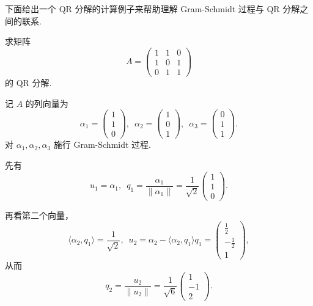 下面给出一个 QR 分解的计算例子来帮助理解 Gram-Schmidt 过程与 QR 分解之间的联系.

\begin{example}{}{}
    求矩阵
    \[
        A = \begin{pmatrix}
            1 & 1 & 0 \\
            1 & 0 & 1 \\
            0 & 1 & 1
        \end{pmatrix}
    \]
    的 QR 分解.
\end{example}

\begin{solution}
    记 $A$ 的列向量为
    \[
        \alpha_1 = \begin{pmatrix}
            1 \\
            1 \\
            0
        \end{pmatrix}, \enspace
        \alpha_2 = \begin{pmatrix}
            1 \\
            0 \\
            1
        \end{pmatrix}, \enspace
        \alpha_3 = \begin{pmatrix}
            0 \\
            1 \\
            1
        \end{pmatrix}.
    \]
    对 $\alpha_1, \alpha_2, \alpha_3$ 施行 Gram-Schmidt 过程.

    先有
    \[
        u_1 = \alpha_1, \enspace q_1 = \frac{\alpha_1}{\lVert \alpha_1 \rVert}
        = \frac{1}{\sqrt{2}}
        \begin{pmatrix}
            1 \\
            1 \\
            0
        \end{pmatrix}.
    \]

    再看第二个向量，
    \[
        \langle \alpha_2, q_1 \rangle = \frac{1}{\sqrt{2}}, \enspace
        u_2 = \alpha_2 - \langle \alpha_2, q_1 \rangle q_1
        =
        \begin{pmatrix}
            \frac{1}{2} \\
            -\frac{1}{2} \\
            1
        \end{pmatrix},
    \]
    从而
    \[
        q_2 = \frac{u_2}{\lVert u_2 \rVert}
        = \frac{1}{\sqrt{6}}
        \begin{pmatrix}
            1 \\
            -1 \\
            2
        \end{pmatrix}.
    \]


\end{solution}
